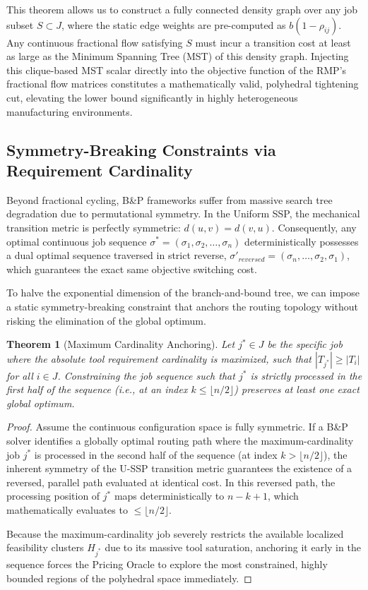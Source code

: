 \documentclass[11pt, a4paper]{book}
\newtheorem{theorem}{Theorem}[chapter]
\begin{document}
	This theorem allows us to construct a fully connected density graph over any job subset $S \subset J$, where the static edge weights are pre-computed as $b(1 - \rho_{ij})$. Any continuous fractional flow satisfying $S$ must incur a transition cost at least as large as the Minimum Spanning Tree (MST) of this density graph. Injecting this clique-based MST scalar directly into the objective function of the RMP's fractional flow matrices constitutes a mathematically valid, polyhedral tightening cut, elevating the lower bound significantly in highly heterogeneous manufacturing environments.
	
	\subsection{Symmetry-Breaking Constraints via Requirement Cardinality}
	
	Beyond fractional cycling, B\&P frameworks suffer from massive search tree degradation due to permutational symmetry. In the Uniform SSP, the mechanical transition metric is perfectly symmetric: $d(u, v) = d(v, u)$. Consequently, any optimal continuous job sequence $\sigma^* = (\sigma_1, \sigma_2, \dots, \sigma_n)$ deterministically possesses a dual optimal sequence traversed in strict reverse, $\sigma'_{reversed} = (\sigma_n, \dots, \sigma_2, \sigma_1)$, which guarantees the exact same objective switching cost. 
	
	To halve the exponential dimension of the branch-and-bound tree, we can impose a static symmetry-breaking constraint that anchors the routing topology without risking the elimination of the global optimum.
	
	\begin{theorem}[Maximum Cardinality Anchoring]
		Let $j^* \in J$ be the specific job where the absolute tool requirement cardinality is maximized, such that $|T_{j^*}| \ge |T_i|$ for all $i \in J$. Constraining the job sequence such that $j^*$ is strictly processed in the first half of the sequence (i.e., at an index $k \le \lfloor n/2 \rfloor$) preserves at least one exact global optimum.
	\end{theorem}
	
	\begin{proof}
		Assume the continuous configuration space is fully symmetric. If a B\&P solver identifies a globally optimal routing path where the maximum-cardinality job $j^*$ is processed in the second half of the sequence (at index $k > \lfloor n/2 \rfloor$), the inherent symmetry of the U-SSP transition metric guarantees the existence of a reversed, parallel path evaluated at identical cost. In this reversed path, the processing position of $j^*$ maps deterministically to $n - k + 1$, which mathematically evaluates to $\le \lfloor n/2 \rfloor$.
		
		Because the maximum-cardinality job severely restricts the available localized feasibility clusters $H_{j^*}$ due to its massive tool saturation, anchoring it early in the sequence forces the Pricing Oracle to explore the most constrained, highly bounded regions of the polyhedral space immediately. 
	\end{proof}
	
\end{document}
